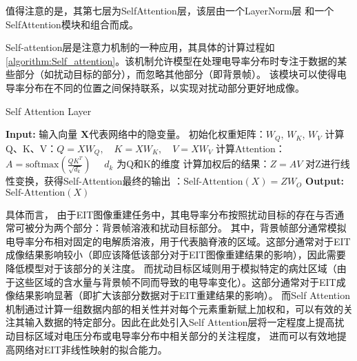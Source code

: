     值得注意的是，其第七层为SelfAttention层，该层由一个LayerNorm层 和一个SelfAttention模块和组合而成。
    
    Self-attention层是注意力机制的一种应用，其具体的计算过程如\cref{algorithm:Self_attention}。该机制允许模型在处理电导率分布时专注于数据的某些部分（如扰动目标的部分），而忽略其他部分（即背景帧）。
    该模块可以使得电导率分布在不同的位置之间保持联系，以实现对扰动部分更好地成像。
    
\begin{algorithm}[H]
    
    \caption{Self Attention Layer}
    \begin{algorithmic}[1]
        \State \textbf{Input:} 输入向量 $\boldsymbol{X}$代表网络中的隐变量。
        \State 初始化权重矩阵：$W_Q$, $W_K$, $W_V$
        \State 计算Q、K、V：$Q = XW_Q, \quad K = XW_K, \quad V = XW_V$
        \State 计算Attention：$A = \text{softmax}\left(\frac{QK^T}{\sqrt{d_k}}\right) \quad $ $d_k$ 为Q和K的维度 
        \State 计算加权后的结果：$Z = AV$
        \State 对Z进行线性变换，获得Self-Attention最终的输出 ：$\text{Self-Attention}(X) = ZW_O$
        \State \textbf{Output:} $\text{Self-Attention}(X)$
    \end{algorithmic}
    \label{algorithm:Self_attention}
\end{algorithm}

    具体而言， 由于EIT图像重建任务中，其电导率分布按照扰动目标的存在与否通常可被分为两个部分：背景帧溶液和扰动目标部分。
    其中，背景帧部分通常模拟电导率分布相对固定的电解质溶液，用于代表脑脊液的区域。这部分通常对于EIT成像结果影响较小（即应该降低该部分对于EIT图像重建结果的影响），因此需要降低模型对于该部分的关注度。
    而扰动目标区域则用于模拟特定的病灶区域（由于这些区域的含水量与背景帧不同而导致的电导率变化）。这部分通常对于EIT成像结果影响显著（即扩大该部分数据对于EIT重建结果的影响）。
    而Self Attention机制通过计算一组数据内部的相关性并对每个元素重新赋上加权和，可以有效的关注其输入数据的特定部分。因此在此处引入Self Attention层将一定程度上提高扰动目标区域对电压分布或电导率分布中相关部分的关注程度，
    进而可以有效地提高网络对EIT非线性映射的拟合能力。


